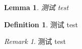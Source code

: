 \documentclass[fontset=none]{ctexart}
\newtheorem{lem}{Lemma}
\theoremstyle{definition}
\newtheorem{defn}{Definition}
\theoremstyle{remark}
\newtheorem*{rem}{Remark}
\begin{document}
  \begin{lem} 测试 test \end{lem}
  \begin{defn} 测试 test \end{defn}
  \begin{rem} 测试 test \end{rem}
\end{document}
